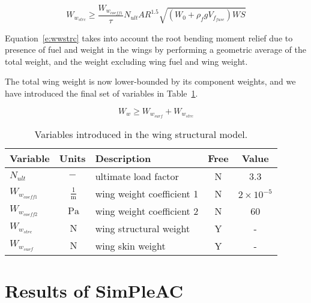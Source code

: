 
\begin{equation} W_{w_{strc}} \geq \frac{W_{w_{coeff1}}}{\tau}
N_{ult} AR ^ {1.5} \sqrt{(W_0+\rho_fgV_{f_{fuse}}) WS} \label{e:wwstrc}
\end{equation}

Equation~\ref{e:wwstrc} takes into account the root
bending moment relief due to presence of fuel and weight in the wings by performing a
geometric average of the total weight, and the weight excluding wing fuel and wing weight.

The total wing weight is now lower-bounded by its component weights, and we have introduced
the final set of variables in Table~\ref{t:vars_wingstrcmodel}.

\begin{equation} W_w \geq W_{w_{surf}} + W_{w_{strc}} \label{e:ww} \end{equation}

\begin{footnotesize}
\begin{table}
    \centering
    \begin{tabular}{ l c l c c }
        \toprule
        Variable & Units & Description & Free & Value \\
        \midrule
        $N_{ult}$ & $-$ & ultimate load factor & N & 3.3 \\
        $W_{w_{coeff1}}$ & $~\mathrm{\tfrac{1}{m}}$ & wing weight coefficient 1 & N &
                $\mathrm{2\times 10^{-5}}$ \\
        $W_{w_{coeff2}}$ & $~\mathrm{Pa}$ & wing weight coefficient 2 & N & 60 \\
        $W_{w_{strc}}$ & $~\mathrm{N}$ & wing structural weight & Y & - \\
        $W_{w_{surf}}$ & $~\mathrm{N}$ & wing skin weight & Y & - \\
    \bottomrule
    \end{tabular}
    \caption{Variables introduced in the wing structural model.}
    \label{t:vars_wingstrcmodel}
\end{table} \end{footnotesize}

\section{Results of SimPleAC}

